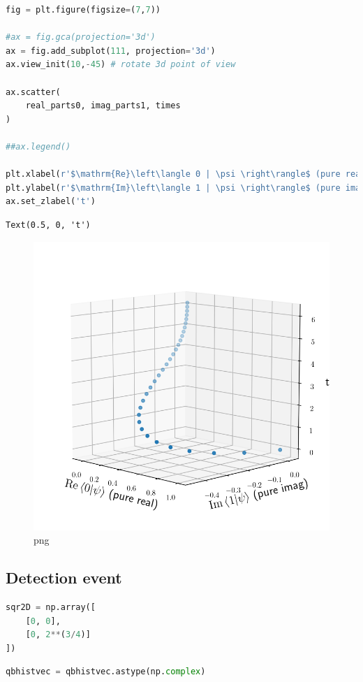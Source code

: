 \begin{lstlisting}[language=Python]
fig = plt.figure(figsize=(7,7))

#ax = fig.gca(projection='3d')
ax = fig.add_subplot(111, projection='3d')
ax.view_init(10,-45) # rotate 3d point of view

ax.scatter(
    real_parts0, imag_parts1, times
)

##ax.legend()

plt.xlabel(r'$\mathrm{Re}\left\langle 0 | \psi \right\rangle$ (pure real)')
plt.ylabel(r'$\mathrm{Im}\left\langle 1 | \psi \right\rangle$ (pure imag)')
ax.set_zlabel('t')
\end{lstlisting}

\begin{lstlisting}
Text(0.5, 0, 't')
\end{lstlisting}

\begin{figure}
\centering
\includegraphics[width=0.6\linewidth]{output_92_1.png}
\caption[]{png}
\end{figure}

\hypertarget{detection-event}{%
\subsection{Detection event}\label{detection-event}}

\begin{lstlisting}[language=Python]
sqr2D = np.array([
    [0, 0],
    [0, 2**(3/4)]
])
\end{lstlisting}

\begin{lstlisting}[language=Python]
qbhistvec = qbhistvec.astype(np.complex)
\end{lstlisting}

